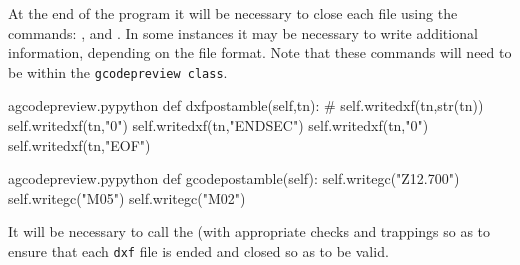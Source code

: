 \documentclass{ltxdoc}
\begin{document}
At the end of the program it will be necessary to close each file using the commands: 
, and
. %
In some instances it may be necessary to write additional information, depending on the file format. Note that these commands will need to be within the \verb|gcodepreview class|.
 
\lstset{firstnumber=\thegcpy}
\begin{writecode}{a}{gcodepreview.py}{python}
    def dxfpostamble(self,tn):
#        self.writedxf(tn,str(tn))
        self.writedxf(tn,"0")
        self.writedxf(tn,"ENDSEC")
        self.writedxf(tn,"0")
        self.writedxf(tn,"EOF")
        
\end{writecode}
\addtocounter{gcpy}{7}

\lstset{firstnumber=\thegcpy}
\begin{writecode}{a}{gcodepreview.py}{python}
    def gcodepostamble(self):
        self.writegc("Z12.700")
        self.writegc("M05")
        self.writegc("M02")
        
\end{writecode}
\addtocounter{gcpy}{5}

It will be necessary to call the  (with appropriate checks and trappings so as to ensure that each \verb|dxf| file is ended and closed so as to be valid.
 
\end{document}
